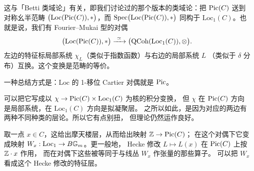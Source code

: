 \begin{example}
这与「Betti 类域论」有关，即我们讨论过的那个版本的类域论：把 $\operatorname{Pic}(C)$ 送到对称幺半范畴
$\bigl(\mathrm{Loc}(\operatorname{Pic}(C)),*\bigr)$，而 $\operatorname{Spec}\bigl(\mathrm{Loc}(\operatorname{Pic}(C)),*\bigr)$
同构于 $\mathrm{Loc}_1(C)$。也就是说，我们有 Fourier–Mukai 型的对偶
\[
\bigl(\mathrm{Loc}(\Pic(C)),*\bigr)\xrightarrow{\ \simeq\ }
\bigl(\QCoh(\mathrm{Loc}_1(C)),\otimes\bigr).
\]
左边的特征标局部系统 $\chi_L$（类似于指数函数）与右边的局部系统 $L$
（类似于 $\delta$ 分布）互换。这个变换是范畴的等价。

一种总结方式是：$\mathrm{Loc}$ 的 1-移位 Cartier 对偶就是 $\operatorname{Pic}$。

可以把它写成以 $\chi\to\operatorname{Pic}(C)\times\mathrm{Loc}_1(C)$ 为核的积分变换，
但 $\chi$ 在 $\operatorname{Pic}(C)$ 方向是局部系统，在 $\mathrm{Loc}_1(C)$ 方向是拟凝聚层。
之所以如此，是因为对应的两边有两种不同种类的层论。所以它有点别扭，
但理论仍然运作良好。

取一点 $x\in C$，这给出摩天楼层，从而给出映射 $\mathbb{Z}\to\operatorname{Pic}(C)$；
在这个对偶下它变成映射 $W_x:\mathrm{Loc}_1\to B\mathbb{G}_m$。更一般地，
Hecke 修改 $L\mapsto L(x)$ 在 $\operatorname{Pic}(C)$ 上按 $\mathbb{Z}\cdot x$ 作用，
而在对偶下这些被等同于与线丛 $W_x$ 作张量的那些算子。
可以把 $W_x$ 看成这个 Hecke 修改的特征层。
\end{example}

